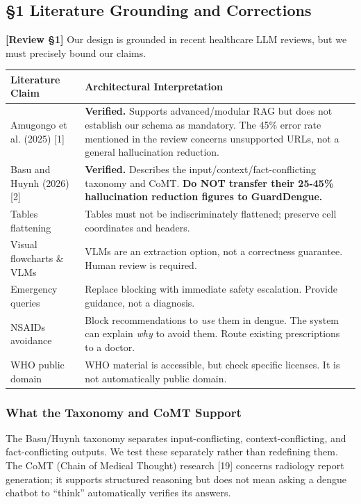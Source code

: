 \documentclass[11pt,a4paper]{article}
\newcommand{\origintag}[2]{\textcolor{#1}{\small\textbf{[#2]}}}
\begin{document}
\subsection{\S1 Literature Grounding and Corrections}
\origintag{amber}{Review \S1}
Our design is grounded in recent healthcare LLM reviews, but we must precisely bound our claims.

\begin{table}[ht]
\centering
\begin{tabularx}{\textwidth}{lX}
\toprule
\textbf{Literature Claim} & \textbf{Architectural Interpretation} \\
\midrule
Amugongo et al. (2025) [1] & \textbf{Verified.} Supports advanced/modular RAG but does not establish our schema as mandatory. The 45\% error rate mentioned in the review concerns unsupported URLs, not a general hallucination reduction. \\
Basu and Huynh (2026) [2] & \textbf{Verified.} Describes the input/context/fact-conflicting taxonomy and CoMT. \textbf{Do NOT transfer their 25-45\% hallucination reduction figures to GuardDengue.} \\
Tables flattening & Tables must not be indiscriminately flattened; preserve cell coordinates and headers. \\
Visual flowcharts \& VLMs & VLMs are an extraction option, not a correctness guarantee. Human review is required. \\
Emergency queries & Replace blocking with immediate safety escalation. Provide guidance, not a diagnosis. \\
NSAIDs avoidance & Block recommendations to \emph{use} them in dengue. The system can explain \emph{why} to avoid them. Route existing prescriptions to a doctor. \\
WHO public domain & WHO material is accessible, but check specific licenses. It is not automatically public domain. \\
\bottomrule
\end{tabularx}
\end{table}

\subsubsection{What the Taxonomy and CoMT Support}
The Basu/Huynh taxonomy separates input-conflicting, context-conflicting, and fact-conflicting outputs. We test these separately rather than redefining them. The CoMT (Chain of Medical Thought) research [19] concerns radiology report generation; it supports structured reasoning but does not mean asking a dengue chatbot to ``think'' automatically verifies its answers.
\end{document}
